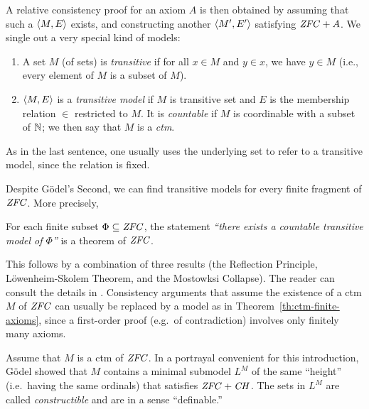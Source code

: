 A relative consistency proof for an axiom $A$ is then obtained by assuming that such a
$\langle M,E\rangle$ exists, and constructing another $\langle M',E'\rangle$
satisfying $\mathit{ZFC} + A$. We single out a very special kind of models:
%
\begin{definition}\label{def:transitive-model}
  \begin{enumerate}
  \item A set $M$ (of sets) is \emph{transitive} if for all $x\in M$ and 
    $y\in x$, we have $y\in M$ (i.e., every element of $M$ is a subset
    of $M$).
  \item $\langle M,E\rangle$ is a \emph{transitive model} if $M$ is transitive
    set and  $E$ is the membership relation $\in$ restricted to
    $M$. It is \emph{countable} if $M$ is coordinable with a subset of
    $\mathbb{N}$; we then say that $M$ is a \emph{ctm}. 
  \end{enumerate}
\end{definition}
%
As in the last sentence, one usually uses the underlying set to refer to a transitive
model, since the relation is fixed. 

Despite G\"odel's Second, we can find transitive models for every
finite fragment of $\mathit{ZFC}$. More precisely, 
%
\begin{theorem}\label{th:ctm-finite-axioms}
  For each finite subset
  $\Phi\subseteq \mathit{ZFC}$, the statement \emph{``there exists a countable
  transitive model of $\Phi$''} is a theorem of $\mathit{ZFC}$.
\end{theorem}
%
This follows by a
combination of three results (the Reflection Principle,
L\"owenheim-Skolem Theorem, and the Mostowksi Collapse). The reader
can consult the details in \cite{kunen2011set}. Consistency arguments that assume
the existence of a ctm $M$ of $\mathit{ZFC}$ can usually be replaced by a
model as in Theorem~\ref{th:ctm-finite-axioms}, since a first-order
proof (e.g.\ of contradiction) involves only finitely many axioms.

Assume that $M$ is a ctm of $\mathit{ZFC}$. In a portrayal convenient for this
introduction, G\"odel showed that $M$ contains a minimal submodel
$L^M$ of the same ``height'' (i.e.\ having the same ordinals)
that satisfies $\mathit{ZFC}+\mathit{CH}$. The sets in $L^M$ are called
\emph{constructible} and are in a sense ``definable.''

